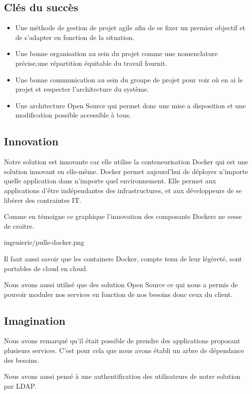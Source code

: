 \subsection{Clés du succès}

\begin{itemize}
\item Une méthode de gestion de projet agile afin de se fixer un premier objectif et de s'adapter en fonction de la situation.
\item Une bonne organisation au sein du projet comme une nomenclature précise,une répartition équitable du travail fournit.
\item Une bonne communication au sein du groupe de projet pour voir où en ai le projet et respecter l'architecture du système.
\item Une architecture Open Source qui permet donc une mise a disposition et une modification possible accessible à tous.
\end{itemize}

\clearpage

\subsection{Innovation}

Notre solution est innovante car elle utilise la conteneurisation Docker qui
est une solution innovant en elle-même. Docker permet aujourd'hui de
déployer n'importe quelle application dans n'importe quel environnement.
Elle permet aux applications d'être indépendantes des infrastructures,
et aux développeurs de se libérer des contraintes IT.

Comme en témoigne ce graphique l'innovation des composants Dockers ne
cesse de croitre.

\begin{figue}{1}{ingenierie/pulls-docker.png}
\caption{Évolution des composants téléchargés depuis \url{hub.docker.com}}
\end{figue}

Il faut aussi savoir que les containers Docker, compte tenu de
leur légèreté, sont portables de cloud en cloud.

Nous avons aussi utilisé que des solution Open Source ce qui nous a
permis de pouvoir moduler nos services en fonction de nos besoins donc
ceux du client.

\subsection{Imagination}

Nous avons remarqué qu'il était possible de prendre des applications
proposant plusieurs services. C'est pour cela que nous avons établi un
arbre de dépendance des besoins.

Nous avons aussi pensé à une authentification des utilisateurs de notre
solution par LDAP.
